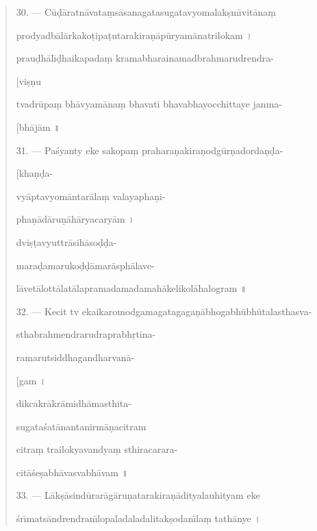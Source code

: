 \documentclass[a4paper, 11pt, oneside, french, landscape, twocolumn]{article}
\begin{document}
\begin{quotation}
\bigskip

30. --- C\={u}\d{d}\={a}ratn\={a}vata\d{m}s\={a}sanagatasugatavyomalak\d{s}m\={\i}vit\={a}na\d{m}

prodyadb\={a}l\={a}rkako\d{t}ipa\d{t}utarakira\d{n}\={a}p\={u}ryam\={a}natrilokam \texthindi{।}

prau\d{d}h\={a}l\={\i}\d{d}haikapada\d{m} kramabharainamadbrahmarudrendra-

\hspace*{55mm}[vi\d{s}\d{n}u

tvadr\={u}pa\d{m} bh\={a}vyam\={a}na\d{m} bhavati bhavabhayocchittaye janma-

\hspace*{55mm}[bh\={a}j\={a}m \texthindi{॥}

\bigskip

31. --- Pa\'{s}yanty eke sakopa\d{m} prahara\d{n}akira\d{n}odg\={u}r\d{n}adorda\d{n}\d{d}a-

\hspace*{55mm}[kha\d{n}\d{d}a-

vy\={a}ptavyom\={a}ntar\={a}la\d{m} valayapha\d{n}i-

pha\d{n}\={a}d\={a}ru\d{n}\={a}h\={a}ryacary\={a}m \texthindi{।}

dvi\d{s}\d{t}avyuttr\={a}sih\={a}so\d{d}\d{d}a-

mara\d{d}amaruko\d{d}\d{d}\={a}mar\={a}sph\={a}lave-

l\={a}vet\={a}lott\={a}lat\={a}lapramadamadamah\={a}kelikol\={a}halogram \texthindi{॥}

\bigskip

32. --- Kecit tv ekaikaromodgamagatagaga\d{n}\={a}bhogabh\={u}bh\={u}talasthasva-

sthabrahmendrarudraprabh\d{r}tina-

ramarutsiddhagandharvan\={a}-

\hspace*{55mm}[gam \texthindi{।}

dikcakr\={a}kr\={a}midh\={a}masthita-

sugata\'{s}at\={a}nantanirm\={a}\d{n}acitram

citra\d{m} trailokyavandya\d{m} sthiracarara-

cit\={a}\'{s}e\d{s}abh\={a}vasvabh\={a}vam \texthindi{॥}

\bigskip

33. --- L\={a}k\d{s}\={a}sind\={u}rar\={a}g\={a}ru\d{n}atarakira\d{n}\={a}dityalauhityam eke

\'{s}r\={\i}mats\={a}ndrendran\={\i}lopaladaladalitak\d{s}odan\={\i}la\d{m} tath\={a}nye \texthindi{।}


\end{quotation}
\end{document}
